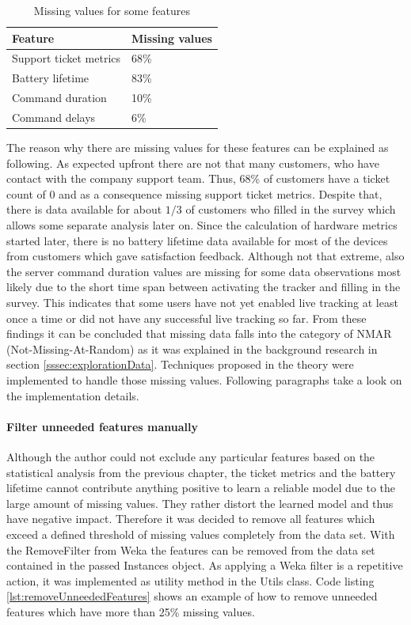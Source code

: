 \begin{table}[]
	\centering
	\begin{tabular}{|l|l|}
		\hline
		\textbf{Feature}         & \textbf{Missing values} \\ \hline
		Support ticket metrics   & 68\%                    \\ \hline
		Battery lifetime & 83\%                    \\ \hline
		Command duration         & 10\%                    \\ \hline
		Command delays           & 6\%                     \\ \hline
	\end{tabular}
	\caption{Missing values for some features}
	\label{tab:preprocessingStatistics}
\end{table}

The reason why there are missing values for these features can be explained as following. As expected upfront there are not that many customers, who have contact with the company support team. Thus, 68\% of customers have a ticket count of 0 and as a consequence missing support ticket metrics. Despite that, there is data available for about $1/3$ of customers who filled in the survey which allows some separate analysis later on. Since the calculation of hardware metrics started later, there is no battery lifetime data available for most of the devices from customers which gave satisfaction feedback. Although not that extreme, also the server command duration values are missing for some data observations most likely due to the short time span between activating the tracker and filling in the survey. This indicates that some users have not yet enabled live tracking at least once a time or did not have any successful live tracking so far. From these findings it can be concluded that missing data falls into the category of NMAR (Not-Missing-At-Random) as it was explained in the background research in section \ref{sssec:explorationData}. Techniques proposed in the theory were implemented to handle those missing values. Following paragraphs take a look on the implementation details. 

\paragraph{Filter unneeded features manually}
Although the author could not exclude any particular features based on the statistical analysis from the previous chapter, the ticket metrics and the battery lifetime cannot contribute anything positive to learn a reliable model due to the large amount of missing values. They rather distort the learned model and thus have negative impact. Therefore it was decided to remove all features which exceed a defined threshold of missing values completely from the data set. With the RemoveFilter from Weka the features can be removed from the data set contained in the passed Instances object. As applying a Weka filter is a repetitive action, it was implemented as utility method in the Utils class. Code listing \ref{lst:removeUnneededFeatures} shows an example of how to remove unneeded features which have more than 25\% missing values.

